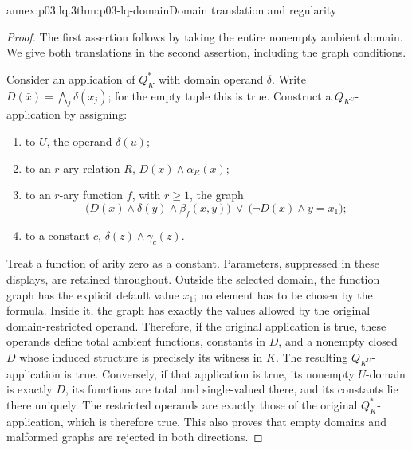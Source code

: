 \begin{annexitem}{annex:p03.lq.3}{thm:p03-lq-domain}{Domain translation and regularity}
\begin{proof}
The first assertion follows by taking the entire nonempty ambient
domain. We give both translations in the second assertion, including
the graph conditions.

Consider an application of \(Q_K^*\) with domain operand \(\delta\).
Write \(D(\bar x)=\bigwedge_j\delta(x_j)\); for the empty tuple
this is true. Construct a \(Q_{K^U}\)-application by assigning:
\begin{enumerate}
 \item to \(U\), the operand \(\delta(u)\);
 \item to an \(r\)-ary relation \(R\),
       \(D(\bar x)\land\alpha_R(\bar x)\);
 \item to an \(r\)-ary function \(f\), with \(r\geq1\), the graph
       \[
       \bigl(D(\bar x)\land\delta(y)\land\beta_f(\bar x,y)\bigr)
       \ \lor\
       \bigl(\neg D(\bar x)\land y=x_1\bigr);
       \]
 \item to a constant \(c\), \(\delta(z)\land\gamma_c(z)\).
\end{enumerate}
Treat a function of arity zero as a constant. Parameters, suppressed
in these displays, are retained throughout. Outside the selected
domain, the function graph has the explicit default value \(x_1\);
no element has to be chosen by the formula. Inside it, the graph
has exactly the values allowed by the original domain-restricted
operand. Therefore, if the original application is true, these
operands define total ambient functions, constants in \(D\), and
a nonempty closed \(D\) whose induced structure is precisely its
witness in \(K\). The resulting \(Q_{K^U}\)-application is true.
Conversely, if that application is true, its nonempty \(U\)-domain
is exactly \(D\), its functions are total and single-valued there,
and its constants lie there uniquely. The restricted operands are
exactly those of the original \(Q_K^*\)-application, which is
therefore true. This also proves that empty domains and malformed
graphs are rejected in both directions.


\end{proof}
\end{annexitem}

